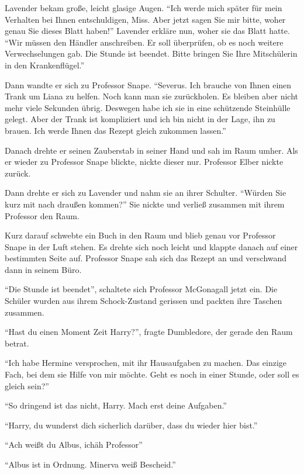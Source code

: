 Lavender bekam große, leicht glasige Augen. \enquote{Ich werde mich später für mein Verhalten bei Ihnen entschuldigen, Miss. Aber jetzt sagen Sie mir bitte, woher genau Sie dieses Blatt haben!} Lavender erkläre nun, woher sie das Blatt hatte. \enquote{Wir müssen den Händler anschreiben. Er soll überprüfen, ob es noch weitere Verwechselungen gab. Die Stunde ist beendet. Bitte bringen Sie Ihre Mitschülerin in den Krankenflügel.}

Dann wandte er sich zu Professor Snape. \enquote{Severus. Ich brauche von Ihnen einen Trank um Liana zu helfen. Noch kann man sie zurückholen. Es bleiben aber nicht mehr viele Sekunden übrig. Deswegen habe ich sie in eine schützende Steinhülle gelegt. Aber der Trank ist kompliziert und ich bin nicht in der Lage, ihn zu brauen. Ich werde Ihnen das Rezept gleich zukommen lassen.}

Danach drehte er seinen Zauberstab in seiner Hand und sah im Raum umher. Als er wieder zu Professor Snape blickte, nickte dieser nur. Professor Elber nickte zurück.

Dann drehte er sich zu Lavender und nahm sie an ihrer Schulter. \enquote{Würden Sie kurz mit nach draußen kommen?} Sie nickte und verließ zusammen mit ihrem Professor den Raum.

Kurz darauf schwebte ein Buch in den Raum und blieb genau vor Professor Snape in der Luft stehen. Es drehte sich noch leicht und klappte danach auf einer bestimmten Seite auf. Professor Snape sah sich das Rezept an und verschwand dann in seinem Büro.

\enquote{Die Stunde ist beendet}, schaltete sich Professor McGonagall jetzt ein. Die Schüler wurden aus ihrem Schock-Zustand gerissen und packten ihre Taschen zusammen.

\enquote{Hast du einen Moment Zeit Harry?}, fragte Dumbledore, der gerade den Raum betrat.

\enquote{Ich habe Hermine versprochen, mit ihr Hausaufgaben zu machen. Das einzige Fach, bei dem sie Hilfe von mir möchte. Geht es noch in einer Stunde, oder soll es gleich sein?}

\enquote{So dringend ist das nicht, Harry. Mach erst deine Aufgaben.}


\trenn

\enquote{Harry, du wunderst dich sicherlich darüber, dass du wieder hier bist.}

\enquote{Ach weißt du Albus, ich\abs äh Professor\abs}

\enquote{Albus ist in Ordnung. Minerva weiß Bescheid.}

